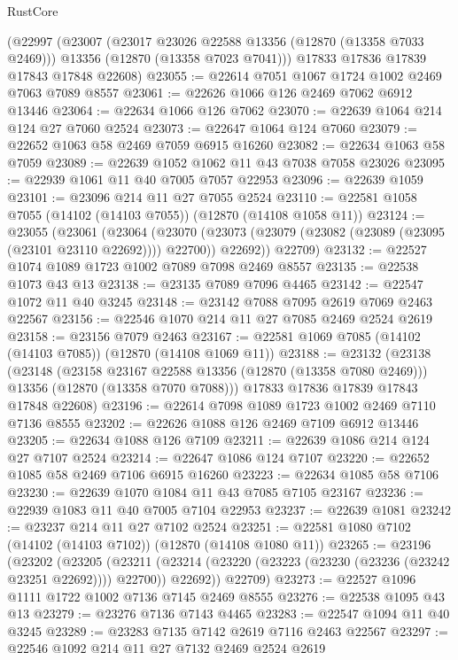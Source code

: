 \begin{lexlean}{RustCore}
\begin{coremodule}
    (@22997
      (@23007
        (@23017 @23026 @22588 @13356 (@12870 (@13358 @7033 @2469)))
        @13356
        (@12870 (@13358 @7023 @7041)))
      @17833
      @17836
      @17839
      @17843
      @17848
      @22608)
@23055 := @22614 @7051 @1067 @1724 @1002 @2469 @7063 @7089 @8557
@23061 := @22626 @1066 @126 @2469 @7062 @6912 @13446
@23064 := @22634 @1066 @126 @7062
@23070 := @22639 @1064 @214 @124 @27 @7060 @2524
@23073 := @22647 @1064 @124 @7060
@23079 := @22652 @1063 @58 @2469 @7059 @6915 @16260
@23082 := @22634 @1063 @58 @7059
@23089 := @22639 @1052 @1062 @11 @43 @7038 @7058 @23026
@23095 := @22939 @1061 @11 @40 @7005 @7057 @22953
@23096 := @22639 @1059
@23101 := @23096 @214 @11 @27 @7055 @2524
@23110 := @22581 @1058 @7055 (@14102 (@14103 @7055)) (@12870 (@14108 @1058 @11))
@23124 := @23055
    (@23061
      (@23064
        (@23070 (@23073 (@23079 (@23082 (@23089 (@23095 (@23101 @23110 @22692)))) @22700)) @22692))
      @22709)
@23132 := @22527 @1074 @1089 @1723 @1002 @7089 @7098 @2469 @8557
@23135 := @22538 @1073 @43 @13
@23138 := @23135 @7089 @7096 @4465
@23142 := @22547 @1072 @11 @40 @3245
@23148 := @23142 @7088 @7095 @2619 @7069 @2463 @22567
@23156 := @22546 @1070 @214 @11 @27 @7085 @2469 @2524 @2619
@23158 := @23156 @7079 @2463
@23167 := @22581 @1069 @7085 (@14102 (@14103 @7085)) (@12870 (@14108 @1069 @11))
@23188 := @23132
    (@23138
      (@23148
        (@23158 @23167 @22588 @13356 (@12870 (@13358 @7080 @2469)))
        @13356
        (@12870 (@13358 @7070 @7088)))
      @17833
      @17836
      @17839
      @17843
      @17848
      @22608)
@23196 := @22614 @7098 @1089 @1723 @1002 @2469 @7110 @7136 @8555
@23202 := @22626 @1088 @126 @2469 @7109 @6912 @13446
@23205 := @22634 @1088 @126 @7109
@23211 := @22639 @1086 @214 @124 @27 @7107 @2524
@23214 := @22647 @1086 @124 @7107
@23220 := @22652 @1085 @58 @2469 @7106 @6915 @16260
@23223 := @22634 @1085 @58 @7106
@23230 := @22639 @1070 @1084 @11 @43 @7085 @7105 @23167
@23236 := @22939 @1083 @11 @40 @7005 @7104 @22953
@23237 := @22639 @1081
@23242 := @23237 @214 @11 @27 @7102 @2524
@23251 := @22581 @1080 @7102 (@14102 (@14103 @7102)) (@12870 (@14108 @1080 @11))
@23265 := @23196
    (@23202
      (@23205
        (@23211 (@23214 (@23220 (@23223 (@23230 (@23236 (@23242 @23251 @22692)))) @22700)) @22692))
      @22709)
@23273 := @22527 @1096 @1111 @1722 @1002 @7136 @7145 @2469 @8555
@23276 := @22538 @1095 @43 @13
@23279 := @23276 @7136 @7143 @4465
@23283 := @22547 @1094 @11 @40 @3245
@23289 := @23283 @7135 @7142 @2619 @7116 @2463 @22567
@23297 := @22546 @1092 @214 @11 @27 @7132 @2469 @2524 @2619

\end{coremodule}
\end{lexlean}
